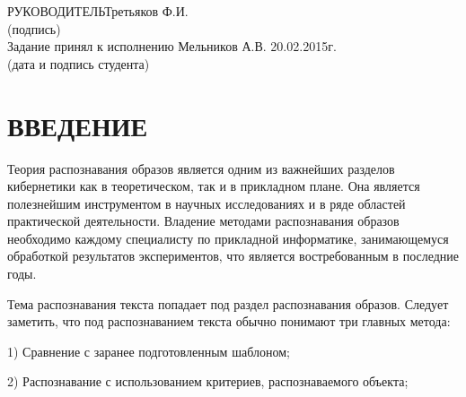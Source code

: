 \documentclass[14pt,a4paper]{extreport}
\begin{document}
	\hspace*{7cm}РУКОВОДИТЕЛЬ\underline{\hspace*{6cm}}\hspace*{-3.9cm}Третьяков Ф.И.\\
	\hspace*{11.5cm}\small (подпись) \normalsize\\
	\bigskip
	Задание принял к исполнению \underline{\hspace*{10.5cm}}\hspace*{-8cm}Мельников А.В. 20.02.2015г.\\
	\hspace*{7cm}\small (дата и подпись студента) \normalsize\\
	
	
	\newpage
	\pagestyle{plain}
	
	\renewcommand\contentsname{\center\normalsize \textbf{СОДЕРЖАНИЕ} \endcenter}
	\tableofcontents
	\endcenter
	




	\newpage
	\section*{\center\normalsize ВВЕДЕНИЕ \endcenter}
	
	\hspace{4ex} Теория распознавания образов является одним из важнейших разделов кибернетики как в теоретическом, так и в прикладном плане. Она является полезнейшим инструментом в научных исследованиях и в ряде областей практической деятельности. Владение методами распознавания образов необходимо каждому специалисту по прикладной информатике, занимающемуся обработкой результатов экспериментов, что является востребованным в последние годы.\

\hspace{4ex}Тема распознавания текста попадает под раздел распознавания образов. Следует заметить, что под распознаванием текста обычно понимают три главных метода:

\hspace{4ex} 1) Сравнение с заранее подготовленным шаблоном;

\hspace{4ex} 2) Распознавание с использованием критериев, распознаваемого объекта;
\end{document}
